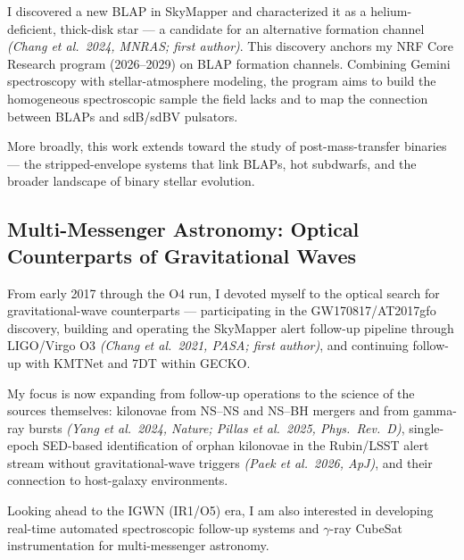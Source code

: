 \documentclass[letterpaper,11pt]{article}
\begin{document}
\smallskip
I discovered a new BLAP in SkyMapper and characterized it as a helium-deficient,
thick-disk star --- a candidate for an alternative formation channel
\emph{(Chang et al.\ 2024, MNRAS; first author)}. This discovery anchors my NRF Core
Research program (2026--2029) on BLAP formation channels. Combining Gemini spectroscopy
with stellar-atmosphere modeling, the program aims to build the homogeneous spectroscopic
sample the field lacks and to map the connection between BLAPs and sdB/sdBV pulsators.

\smallskip
More broadly, this work extends toward the study of post-mass-transfer binaries ---
the stripped-envelope systems that link BLAPs, hot subdwarfs, and the broader landscape
of binary stellar evolution.

\subsection*{Multi-Messenger Astronomy: Optical Counterparts of Gravitational Waves}
From early 2017 through the O4 run, I devoted myself to the optical search for
gravitational-wave counterparts --- participating in the GW170817/AT2017gfo discovery,
building and operating the SkyMapper alert follow-up pipeline through LIGO/Virgo O3
\emph{(Chang et al.\ 2021, PASA; first author)}, and continuing follow-up with KMTNet and
7DT within GECKO.

\smallskip
My focus is now expanding from follow-up operations to the science of the sources
themselves: kilonovae from NS--NS and NS--BH mergers and from gamma-ray bursts
\emph{(Yang et al.\ 2024, Nature; Pillas et al.\ 2025, Phys.\ Rev.\ D)}, single-epoch
SED-based identification of orphan kilonovae in the Rubin/LSST alert stream without
gravitational-wave triggers \emph{(Paek et al.\ 2026, ApJ)}, and their connection to
host-galaxy environments.

\smallskip
Looking ahead to the IGWN (IR1/O5) era, I am also interested in developing real-time
automated spectroscopic follow-up systems and $\gamma$-ray CubeSat instrumentation for
multi-messenger astronomy.


\end{document}
